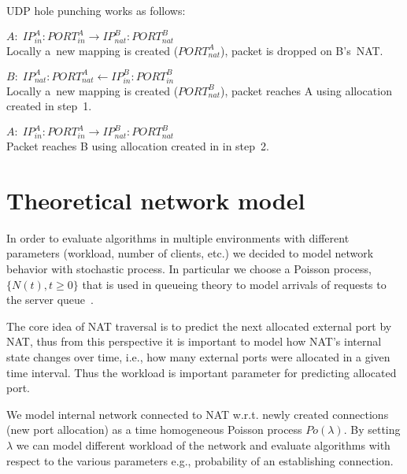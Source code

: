 \documentclass[twoside]{article}
\begin{document}
\begin{multicols}{2}
UDP hole punching works as follows:
\begin{compactitem}
 \item [1.] $A: \; IP^A_{in}:PORT^A_{in} \longrightarrow IP^B_{nat}:PORT^B_{nat}$ \\
Locally a~new mapping is created ($PORT^A_{nat}$), packet is dropped on B's~NAT.
 \item [2.] $B: \; IP^A_{nat}:PORT^A_{nat} \longleftarrow  IP^B_{in}:PORT^B_{in}$ \\
Locally a~new mapping is created ($PORT^B_{nat}$), packet reaches A using allocation created in step~1.
 \item [3.] $A: \; IP^A_{in}:PORT^A_{in} \longrightarrow IP^B_{nat}:PORT^B_{nat}$ \\
Packet reaches B using allocation created in in step~2.
\end{compactitem}


\section{Theoretical network model}
In order to evaluate algorithms in multiple environments with different parameters (workload, number of clients, etc.)
we decided to model network behavior with stochastic process. In particular we choose a Poisson process, $\{N(t), t\geq0\}$ 
that is used in queueing theory to model arrivals of requests to the server queue~\citep{Nelson:1995:PSP:207382}. 

The core idea of NAT traversal is to predict the next allocated external port by NAT, thus from this perspective 
it is important to model how NAT's internal state changes over time, i.e., how many external ports 
were allocated in a given time interval. Thus the workload is important parameter for predicting allocated port.

We model internal network connected to NAT w.r.t. newly created connections (new port allocation) as a 
time homogeneous Poisson process $Po(\lambda)$. By setting $\lambda$ we can model 
different workload of the network and evaluate algorithms with respect to the various parameters e.g., 
probability of an establishing connection. 



\end{multicols}
\end{document}
